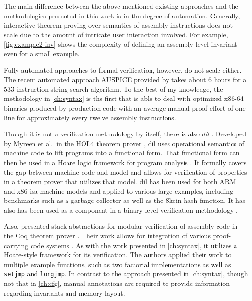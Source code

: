 The main difference between the above-mentioned existing approaches
and the methodologies presented in this work is in the degree of automation.
Generally, interactive theorem proving over semantics of assembly instructions
does not scale due to the amount of intricate user interaction involved.
For example, \cref{fig:example2-inv} shows
the complexity of defining an assembly-level invariant even for a small example.

Fully automated approaches to formal verification, however, do not scale either.
The recent automated approach AUSPICE provided by \textcite{tan2015auspice}
takes about 6 hours for a 533-instruction string search algorithm.
To the best of my knowledge,
the methodology in \cref{ch:syntax} is the first that is able to deal with
optimized x86-64 binaries produced by production code
with an average manual proof effort of one line
for approximately every twelve assembly instructions.

Though it is not a verification methodology by itself,
there is also \emph{\ac{dil}} \autocite{myreen2008decompilation,myreen2012decompilation}.
Developed by Myreen et al.\ in the HOL4 theorem prover \autocite{slind2008brief},
\ac{dil} uses operational semantics of machine code
to lift programs into a functional form.
That functional form can then be used in a Hoare logic framework
for program analysis \autocite{myreen2007hoare}.
It formally covers the gap between machine code and  model
and allows for verification of properties in a theorem prover that utilizes that model.
\Ac{dil} has been used for both ARM and x86 \ac{isa} machine models
and applied to various large examples,
including benchmarks such as a garbage collector as well as the Skein hash function.
It has also has been used as a component in a binary-level verification methodology \autocite{sewell2013tvv}.

Also, \textcite{feng2006modular,feng2005sbca} presented stack abstractions
for modular verification of assembly code
in the Coq theorem prover \autocite{chlipala2013certified}.
Their work allows for integration
of various proof-carrying code systems \autocite{necula1997proof}.
As with the work presented in \cref{ch:syntax},
it utilizes a Hoare-style framework for its verification.
The authors applied their work to multiple example functions,
such as two factorial implementations
as well as \lstinline[style=C]|setjmp| and \lstinline[style=C]|longjmp|.
In contrast to the approach presented in \cref{ch:syntax},
though not that in \cref{ch:cfg},
manual annotations are required to provide information
regarding invariants and memory layout.

